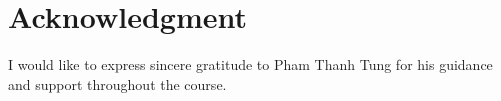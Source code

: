\cleardoublepage
{}
\chapter*{Acknowledgment}

I would like to express sincere gratitude to Pham Thanh Tung for his guidance and support throughout the course.

\clearpage